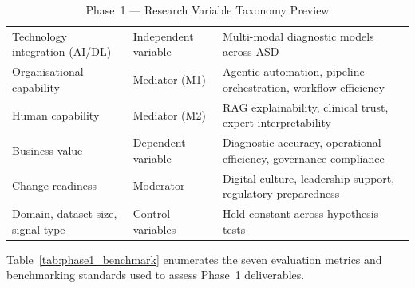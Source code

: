 \begingroup\singlespacing\tablefontsize\tablestripes
\begin{xltabular}{\textwidth}{@{} p{3.2cm} p{2.5cm} X @{}}
\caption{Phase~1 --- Research Variable Taxonomy Preview}
\label{tab:phase1_variables}\\
\toprule
{} &  &  \\
\midrule
\endfirsthead
\endhead
\bottomrule
\endlastfoot
Technology integration (AI/DL)  & Independent variable  & Multi-modal diagnostic models across ASD \\
\addlinespace
Organisational capability          & Mediator (M1)         & Agentic automation, pipeline orchestration, workflow efficiency \\
\addlinespace
Human capability                   & Mediator (M2)         & RAG explainability, clinical trust, expert interpretability \\
\addlinespace
Business value                     & Dependent variable    & Diagnostic accuracy, operational efficiency, governance compliance \\
\addlinespace
Change readiness                   & Moderator             & Digital culture, leadership support, regulatory preparedness \\
\addlinespace
Domain, dataset size, signal type  & Control variables     & Held constant across hypothesis tests \\
\end{xltabular}
\endgroup

\vspace{1.5em}

Table~\ref{tab:phase1_benchmark} enumerates the seven evaluation metrics and benchmarking standards used to assess Phase~1 deliverables.

